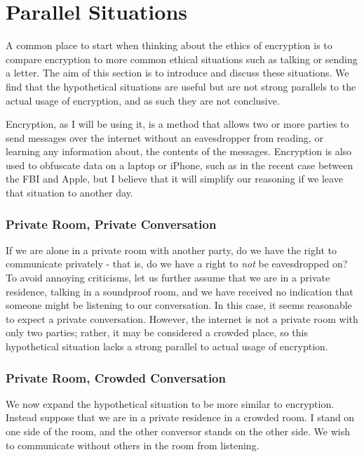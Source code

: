 \documentclass[11pt]{article}
\begin{document}
\section{Parallel Situations}
A common place to start when thinking about the ethics of encryption is to compare encryption to more common ethical situations such as talking or sending a letter.
The aim of this section is to introduce and discuss these situations.
We find that the hypothetical situations are useful but are not strong parallels to the actual usage of encryption, and as such they are not conclusive.

Encryption, as I will be using it, is a method that allows two or more parties to send messages over the internet without an eavesdropper from reading, or learning any information about, the contents of the messages.
Encryption is also used to obfuscate data on a laptop or iPhone, such as in the recent case between the FBI and Apple, but I believe that it will simplify our reasoning if we leave that situation to another day.

\subsubsection{Private Room, Private Conversation}
If we are alone in a private room with another party, do we have the right to communicate privately - that is, do we have a right to \textit{not} be eavesdropped on?
To avoid annoying criticisms, let us further assume that we are in a private residence, talking in a soundproof room, and we have received no indication that someone might be listening to our conversation.
In this case, it seems reasonable to expect a private conversation.
However, the internet is not a private room with only two parties; rather, it may be considered a crowded place, so this hypothetical situation lacks a strong parallel to actual usage of encryption.


\subsubsection{Private Room, Crowded Conversation}

We now expand the hypothetical situation to be more similar to encryption.
Instead suppose that we are in a private residence in a crowded room. 
I stand on one side of the room, and the other conversor stands on the other side.
We wish to communicate without others in the room from listening.
\end{document}
